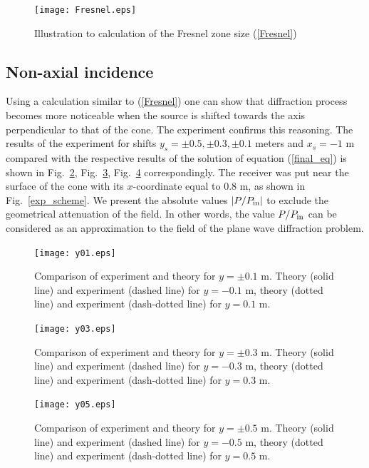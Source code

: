 \documentclass{procDDs}
\begin{document}
\begin{figure}[t!]\centering
	\texttt{[image: Fresnel.eps]}
	\caption{Illustration to calculation of the Fresnel zone size (\ref{Fresnel})}\label{figFresnel}
\end{figure}


\subsection{Non-axial incidence}
Using a calculation similar to (\ref{Fresnel}) one can show that diffraction process becomes more noticeable when the source is shifted towards the axis perpendicular to that of the cone. The experiment confirms this reasoning. The results of the experiment for shifts $y_s = \pm0.5, \pm0.3, \pm 0.1$ meters and $x_s =-1$ m  compared with the respective results of the solution of equation (\ref{final_eq}) is shown in Fig.~\ref{y01}, Fig.~\ref{y03}, Fig.~\ref{y05} correspondingly. The receiver was put near the surface of the cone with its $x$-coordinate equal to $0.8$ m, as shown in Fig.~\ref{exp_scheme}. We present the absolute values $|P/P_{\rm in}|$ to exclude the geometrical attenuation of the field. In other words, the value $P/P_{\rm in}$ can be considered as an approximation to the field of the plane wave diffraction problem.

\begin{figure}[t!]\centering
	\texttt{[image: y01.eps]}
	\caption{Comparison of experiment and theory for $y = \pm 0.1$ m. Theory (solid line) and experiment (dashed line) for $y = -0.1$ m, theory (dotted line) and experiment (dash-dotted line) for $y = 0.1$ m.}\label{y01}
\end{figure}

\begin{figure}[t!]\centering
	\texttt{[image: y03.eps]}
	\caption{Comparison of experiment and theory for $y = \pm 0.3$ m. Theory (solid line) and experiment (dashed line) for $y = -0.3$ m, theory (dotted line) and experiment (dash-dotted line) for $y = 0.3$ m.}\label{y03}
\end{figure}

\begin{figure}[t!]\centering
	\texttt{[image: y05.eps]}
	\caption{Comparison of experiment and theory for $y = \pm 0.5$ m. Theory (solid line) and experiment (dashed line) for $y = -0.5$ m, theory (dotted line) and experiment (dash-dotted line) for $y = 0.5$ m.}\label{y05}
\end{figure}
\end{document}
